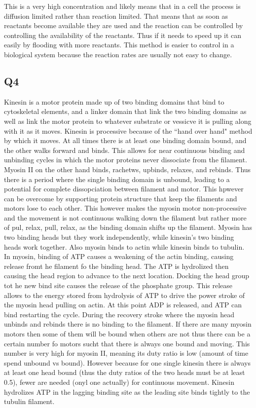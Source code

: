 \documentclass[12pt]{article}
\begin{document}
This is a very high concentration and likely means that in a cell the process is diffusion limited rather than reaction limited. That means that as soon as reactants become available they are used and the reaction can be controlled by controlling the availability of the reactants. Thus if it needs to speed up it can easily by flooding with more reactants. This method is easier to control in a biological system because the reaction rates are usually not easy to change.

\subsection{Q4}
Kinesin is a motor protein made up of two binding domains that bind to cytoskeletal elements, and a linker domain that link the two binding domains as well as link the motor protein to whatever substrate or vessicve it is pulling along with it as it moves. Kinesin is processive because of the ``hand over hand" method by which it moves. At all times there is at least one binding domain bound, and the other walks forward and binds. This allows for near continuous binding and unbinding cycles in which the motor proteins never dissociate from the filament.  Myosin II on the other hand binds, rachetws, upbinds, relaxes, and rebinds. Thus there is a period where the single binding domain is unbound, leading to a potential for complete dissopciation between filament and motor. This hpwever can be overcome by supporting protein structure that keep the filaments and motors lose to each other. This however makes the myosin motor non-processive and the movement is not continuous walking down the filament but rather more of pul, relax, pull, relax, as the binding domain shifts up the filament. Myosin has two binding heads but they work independently, while kinesin's two binding heads work together. Also myosin binds to actin while kinesin binds to tubulin. In myosin, binding of ATP causes a weakening of the actin binding, causing release fromt he filament fo the binding head. The ATP is hydrolized then causing the head region to advance to the next location. Docking the head group tot he new bind site causes the release of the phosphate group. This release allows to the energy stored from hydrolysis of ATP to drive the power stroke of the myosin head pulling on actin. At this point ADP is released, and ATP can bind restarting the cycle. During the recovery stroke where the myosin head unbinds and rebinds there is no binding to the filament. If there are many myosin motors then some of them will be bound when others are not thus there can be a certain number fo motors sucht that there is always one bound and moving. This number is very high for myosin II, meaning its duty ratio is low (amount of time spend unbound vs bound). However because for one single kinesin there is always at least one head bound (thus the duty ratios of the two heads must be at least 0.5), fewer are needed (onyl one actually) for continuous movement. Kinesin hydrolizes ATP in the lagging binding site as the leading site binds tightly to the tubulin filament.
\end{document}
